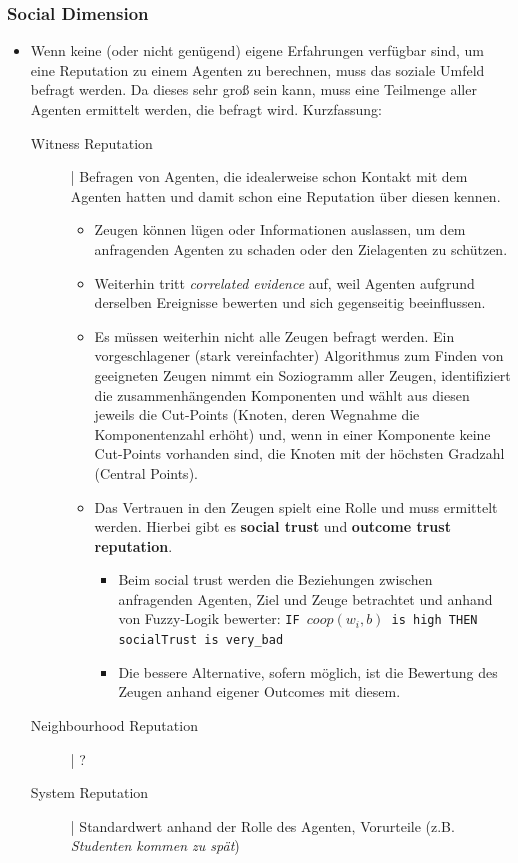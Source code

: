 \documentclass{article} %
\begin{document}
	\subsubsection{Social Dimension}
	\begin{itemize}
		\item Wenn keine (oder nicht genügend) eigene Erfahrungen verfügbar sind, um eine Reputation zu einem Agenten zu berechnen, muss das soziale Umfeld befragt werden.
		Da dieses sehr groß sein kann, muss eine Teilmenge aller Agenten ermittelt werden, die befragt wird. Kurzfassung:
		\begin{description}
			\item[Witness Reputation]| Befragen von Agenten, die idealerweise schon Kontakt mit dem Agenten hatten und damit schon eine Reputation über diesen kennen.
			\begin{itemize}
				\item Zeugen können lügen oder Informationen auslassen, um dem anfragenden Agenten zu schaden oder den Zielagenten zu schützen.
				\item Weiterhin tritt \emph{correlated evidence} auf, weil Agenten aufgrund derselben Ereignisse bewerten und sich gegenseitig beeinflussen.
				\item Es müssen weiterhin nicht alle Zeugen befragt werden.
				Ein vorgeschlagener (stark vereinfachter) Algorithmus zum Finden von geeigneten Zeugen nimmt ein Soziogramm aller Zeugen, identifiziert die zusammenhängenden Komponenten und wählt aus diesen jeweils die Cut-Points (Knoten, deren Wegnahme die Komponentenzahl erhöht) und, wenn in einer Komponente keine Cut-Points vorhanden sind, die Knoten mit der höchsten Gradzahl (Central Points).
				\item Das Vertrauen in den Zeugen spielt eine Rolle und muss ermittelt werden.
				Hierbei gibt es \textbf{social trust} und \textbf{outcome trust reputation}.
				\begin{itemize}
					\item Beim social trust werden die Beziehungen zwischen anfragenden Agenten, Ziel und Zeuge betrachtet und anhand von Fuzzy-Logik bewerter: \texttt{IF $coop(w_i,b)$ is high THEN socialTrust is very\_bad}
					\item Die bessere Alternative, sofern möglich, ist die Bewertung des Zeugen anhand eigener Outcomes mit diesem.
				\end{itemize}
			\end{itemize}
			\item[Neighbourhood Reputation]| ?
			\item[System Reputation]| Standardwert anhand der Rolle des Agenten, Vorurteile (z.B. \emph{Studenten kommen zu spät})
		\end{description}
	\end{itemize}
	
\end{document}
